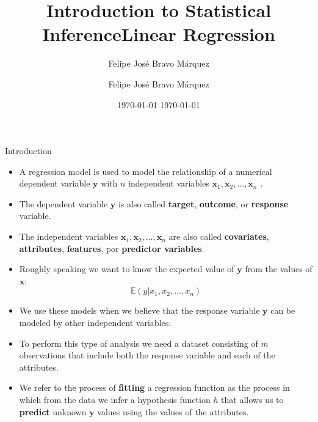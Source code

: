 \documentclass[handout]{beamer}
\title{Introduction to Statistical Inference}
\author[Felipe Bravo Márquez]{\footnotesize
 \textcolor[rgb]{0.00,0.00,1.00}{Felipe José Bravo Márquez}}
\date{ \today }
\title{Linear Regression}
\author[Felipe Bravo Márquez]{\footnotesize
 \textcolor[rgb]{0.00,0.00,1.00}{Felipe José Bravo Márquez}}
\date{ \today }
\begin{document}
\begin{frame}
\titlepage


\end{frame}





\begin{frame}{Introduction}
\scriptsize{
\begin{itemize}

 \item  A regression model is used to model the relationship of a numerical dependent variable $\mathbf{y}$ with $n$ independent variables  $\mathbf{x}_1, \mathbf{x}_2, \dots, \mathbf{x}_n$ \cite{wasserman2013all}. 
 
 \item The dependent variable $\mathbf{y}$ is also called \textbf{target}, \textbf{outcome}, or \textbf{response} variable.
 
 \item The independent variables  $\mathbf{x}_1, \mathbf{x}_2, \dots, \mathbf{x}_n$ are also called \textbf{covariates}, \textbf{attributes}, \textbf{features}, por \textbf{predictor variables}.
 
 
 \item  Roughly speaking we want to know the expected value of $\mathbf{y}$ from the values of $\mathbf{x}$:
 \begin{displaymath}
 \mathbb{E}(y|x_1,x_2,\dots,x_n)
 \end{displaymath}

 
 \item  We use these models when we believe that the response variable $\mathbf{y}$ can be modeled by other independent variables.
 
 \item To perform this type of analysis we need a dataset consisting of $m$ observations that include both the response variable and each of the attributes.
 
 \item We refer to the process of \textbf{fitting} a regression function as the process in which from the data we infer a hypothesis function $h$ that allows us to \textbf{predict} unknown $\mathbf{y}$ values using the values of the attributes.

 
\end{itemize}



} 
 
\end{frame}
\end{document}
